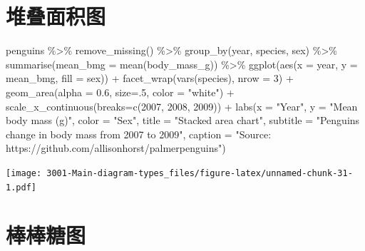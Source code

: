 \documentclass[
]{book}
\newenvironment{Shaded}{\begin{snugshade}}{\end{snugshade}}
\newcommand{\AttributeTok}[1]{\textcolor[rgb]{0.77,0.63,0.00}{#1}}
\newcommand{\DecValTok}[1]{\textcolor[rgb]{0.00,0.00,0.81}{#1}}
\newcommand{\FloatTok}[1]{\textcolor[rgb]{0.00,0.00,0.81}{#1}}
\newcommand{\FunctionTok}[1]{\textcolor[rgb]{0.00,0.00,0.00}{#1}}
\newcommand{\NormalTok}[1]{#1}
\newcommand{\SpecialCharTok}[1]{\textcolor[rgb]{0.00,0.00,0.00}{#1}}
\newcommand{\StringTok}[1]{\textcolor[rgb]{0.31,0.60,0.02}{#1}}
\begin{document}
\hypertarget{ux5806ux53e0ux9762ux79efux56fe}{%
\section{堆叠面积图}\label{ux5806ux53e0ux9762ux79efux56fe}}

\begin{Shaded}
\begin{Highlighting}[]
\NormalTok{penguins }\SpecialCharTok{\%\textgreater{}\%}
    \FunctionTok{remove\_missing}\NormalTok{() }\SpecialCharTok{\%\textgreater{}\%}
    \FunctionTok{group\_by}\NormalTok{(year, species, sex) }\SpecialCharTok{\%\textgreater{}\%}
    \FunctionTok{summarise}\NormalTok{(}\AttributeTok{mean\_bmg =} \FunctionTok{mean}\NormalTok{(body\_mass\_g)) }\SpecialCharTok{\%\textgreater{}\%}
    \FunctionTok{ggplot}\NormalTok{(}\FunctionTok{aes}\NormalTok{(}\AttributeTok{x =}\NormalTok{ year, }\AttributeTok{y =}\NormalTok{ mean\_bmg, }\AttributeTok{fill =}\NormalTok{ sex)) }\SpecialCharTok{+}
    \FunctionTok{facet\_wrap}\NormalTok{(}\FunctionTok{vars}\NormalTok{(species), }\AttributeTok{nrow =} \DecValTok{3}\NormalTok{) }\SpecialCharTok{+}
    \FunctionTok{geom\_area}\NormalTok{(}\AttributeTok{alpha =} \FloatTok{0.6}\NormalTok{, }\AttributeTok{size=}\NormalTok{.}\DecValTok{5}\NormalTok{, }\AttributeTok{color =} \StringTok{"white"}\NormalTok{) }\SpecialCharTok{+}
    \FunctionTok{scale\_x\_continuous}\NormalTok{(}\AttributeTok{breaks=}\FunctionTok{c}\NormalTok{(}\DecValTok{2007}\NormalTok{, }\DecValTok{2008}\NormalTok{, }\DecValTok{2009}\NormalTok{)) }\SpecialCharTok{+}
      \FunctionTok{labs}\NormalTok{(}\AttributeTok{x =} \StringTok{"Year"}\NormalTok{, }
           \AttributeTok{y =} \StringTok{"Mean body mass (g)"}\NormalTok{,}
           \AttributeTok{color =} \StringTok{"Sex"}\NormalTok{,}
          \AttributeTok{title =} \StringTok{"Stacked area chart"}\NormalTok{, }
          \AttributeTok{subtitle =} \StringTok{"Penguin\textquotesingle{}s change in body mass from 2007 to 2009"}\NormalTok{,}
          \AttributeTok{caption =} \StringTok{"Source: https://github.com/allisonhorst/palmerpenguins"}\NormalTok{)}
\end{Highlighting}
\end{Shaded}

\texttt{[image: 3001-Main-diagram-types\_files/figure-latex/unnamed-chunk-31-1.pdf]}

\hypertarget{ux68d2ux68d2ux7cd6ux56fe}{%
\section{棒棒糖图}\label{ux68d2ux68d2ux7cd6ux56fe}}
\end{document}
